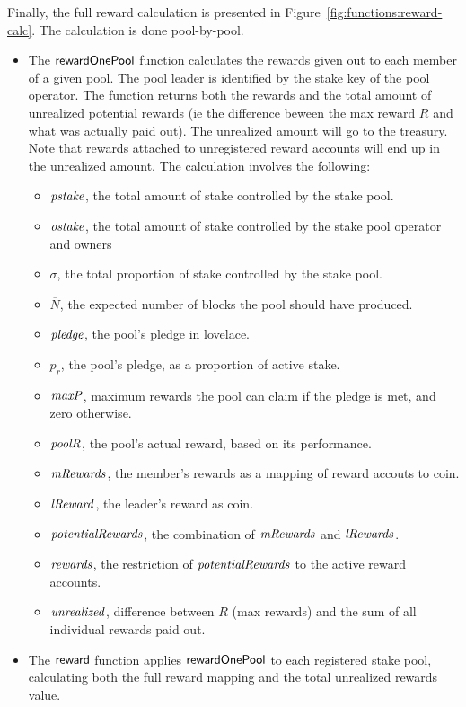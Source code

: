 Finally, the full reward calculation is presented in Figure~\ref{fig:functions:reward-calc}.
The calculation is done pool-by-pool.
\begin{itemize}
  \item The $\mathsf{rewardOnePool}$ function calculates the rewards given out to each member of a
    given pool. The pool leader is identified by the stake key of the pool operator.  The function
    returns both the rewards and the total amount of unrealized potential rewards (ie the
    difference beween the max reward $R$ and what was actually paid out).  The unrealized
    amount will go to the treasury. Note that rewards attached to unregistered reward accounts
    will end up in the unrealized amount.
    The calculation involves the following:
    \begin{itemize}
      \item $\mathit{pstake}$, the total amount of stake controlled by the stake pool.
      \item $\mathit{ostake}$, the total amount of stake controlled by the stake pool operator
        and owners
      \item $\sigma$, the total proportion of stake controlled by the stake pool.
      \item $\overline{N}$, the expected number of blocks the pool should have produced.
      \item $\mathit{pledge}$, the pool's pledge in lovelace.
      \item $p_r$, the pool's pledge, as a proportion of active stake.
      \item $\mathit{maxP}$, maximum rewards the pool can claim if the pledge is met,
        and zero otherwise.
      \item $\mathit{poolR}$, the pool's actual reward, based on its performance.
      \item $\mathit{mRewards}$, the member's rewards as a mapping of reward accouts to coin.
      \item $\mathit{lReward}$, the leader's reward as coin.
      \item $\mathit{potentialRewards}$, the combination of $\mathit{mRewards}$ and $\mathit{lRewards}$.
      \item $\mathit{rewards}$, the restriction of $\mathit{potentialRewards}$ to the active
        reward accounts.
      \item $\mathit{unrealized}$, difference between $R$ (max rewards) and the sum of all
        individual rewards paid out.
    \end{itemize}
  \item The $\mathsf{reward}$ function applies $\mathsf{rewardOnePool}$ to each registered stake
    pool, calculating both the full reward mapping and the total unrealized rewards value.
\end{itemize}

